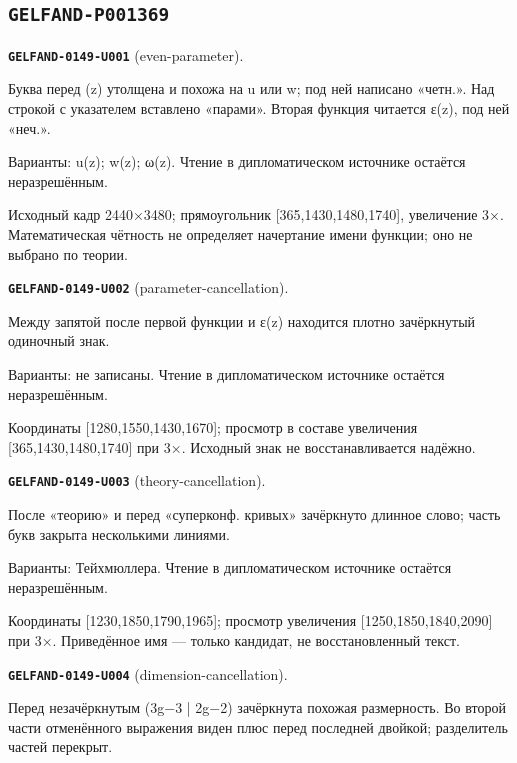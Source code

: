 \documentclass[11pt]{article}
\theoremstyle{definition}
\theoremstyle{remark}
\begin{document}
\subsection*{\texttt{GELFAND-P001369}}
\noindent\leavevmode{}\label{GELFAND-P001369:even-parameter:note}\textbf{\texttt{GELFAND-0149-U001}} (even-parameter).\par\nopagebreak[4]
Буква перед (z) утолщена и похожа на u или w; под ней написано «четн.». Над строкой с указателем вставлено «парами». Вторая функция читается ε(z), под ней «неч.». \par
Варианты: u(z); w(z); ω(z). Чтение в дипломатическом источнике остаётся неразрешённым.\par
Исходный кадр 2440×3480; прямоугольник [365,1430,1480,1740], увеличение 3×. Математическая чётность не определяет начертание имени функции; оно не выбрано по теории.\par\medskip
\noindent\leavevmode{}\label{GELFAND-P001369:parameter-cancellation:note}\textbf{\texttt{GELFAND-0149-U002}} (parameter-cancellation).\par\nopagebreak[4]
Между запятой после первой функции и ε(z) находится плотно зачёркнутый одиночный знак.\par
Варианты: не записаны. Чтение в дипломатическом источнике остаётся неразрешённым.\par
Координаты [1280,1550,1430,1670]; просмотр в составе увеличения [365,1430,1480,1740] при 3×. Исходный знак не восстанавливается надёжно.\par\medskip
\noindent\leavevmode{}\label{GELFAND-P001369:theory-cancellation:note}\textbf{\texttt{GELFAND-0149-U003}} (theory-cancellation).\par\nopagebreak[4]
После «теорию» и перед «суперконф. кривых» зачёркнуто длинное слово; часть букв закрыта несколькими линиями.\par
Варианты: Тейхмюллера. Чтение в дипломатическом источнике остаётся неразрешённым.\par
Координаты [1230,1850,1790,1965]; просмотр увеличения [1250,1850,1840,2090] при 3×. Приведённое имя — только кандидат, не восстановленный текст.\par\medskip
\noindent\leavevmode{}\label{GELFAND-P001369:dimension-cancellation:note}\textbf{\texttt{GELFAND-0149-U004}} (dimension-cancellation).\par\nopagebreak[4]
Перед незачёркнутым (3g−3 | 2g−2) зачёркнута похожая размерность. Во второй части отменённого выражения виден плюс перед последней двойкой; разделитель частей перекрыт.\par
\end{document}
